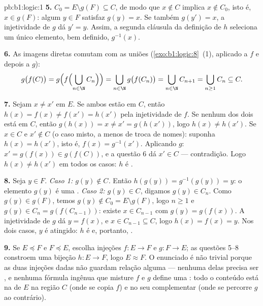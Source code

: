 \begin{solution}{pb:b1:logic:1}
\textbf{5.} $C_0 = E \setminus g(F) \subseteq C$, de modo que $x \notin C$
implica $x \notin C_0$, isto é, $x \in g(F)$: algum $y \in F$ satisfaz
$g(y) = x$. Se também $g(y') = x$, a injetividade de $g$ dá $y' = y$.
Assim, a segunda cláusula da definição de $h$ seleciona um único
elemento, bem definido, $g^{-1}(x)$.

\textbf{6.} As imagens diretas comutam com as uniões
(\cref{exo:b1:logic:8}~(1), aplicado a $f$ e depois a $g$):
\[
g\bigl(f(C)\bigr)
= g\Bigl(f\Bigl(\bigcup_{n \in \N} C_n\Bigr)\Bigr)
= \bigcup_{n \in \N} g\bigl(f(C_n)\bigr)
= \bigcup_{n \in \N} C_{n+1}
= \bigcup_{n \geq 1} C_n \subseteq C .
\]

\textbf{7.} Sejam $x \neq x'$ em $E$. Se ambos estão em $C$, então $h(x) =
f(x) \neq f(x') = h(x')$ pela injetividade de $f$. Se nenhum dos dois está em
$C$, então $g(h(x)) = x \neq x' = g(h(x'))$, logo $h(x) \neq h(x')$. Se
$x \in C$ e $x' \notin C$ (o caso misto, a menos de troca de nomes):
suponha $h(x) = h(x')$, isto é, $f(x) = g^{-1}(x')$. Aplicando $g$:
$x' = g(f(x)) \in g(f(C))$, e a questão 6 dá $x' \in C$ ---
contradição. Logo $h(x) \neq h(x')$ em todos os casos: $h$ é .

\textbf{8.} Seja $y \in F$. \emph{Caso 1: $g(y) \notin C$.} Então
$h(g(y)) = g^{-1}(g(y)) = y$: o elemento $g(y)$ é uma .
\emph{Caso 2: $g(y) \in C$}, digamos $g(y) \in C_n$. Como $g(y) \in
g(F)$, temos $g(y) \notin C_0 = E \setminus g(F)$, logo $n \geq 1$
e $g(y) \in C_n = g(f(C_{n-1}))$: existe $x \in C_{n-1}$ com
$g(y) = g(f(x))$. A injetividade de $g$ dá $y = f(x)$, e $x \in
C_{n-1} \subseteq C$, logo $h(x) = f(x) = y$. Nos dois casos, $y$ é
atingido: $h$ é  e, portanto, .

\textbf{9.} Se $E \preceq F$ e $F \preceq E$, escolha injeções $f
\colon E \to F$ e $g \colon F \to E$; as questões 5--8 constroem uma
bijeção $h \colon E \to F$, logo $E \approx F$. O enunciado é
não trivial porque as duas injeções dadas não guardam relação alguma ---
nenhuma delas precisa ser , e nenhuma fórmula ingênua que
misture $f$ e $g$ define uma : todo o conteúdo está na 
de $E$ na região $C$ (onde se copia $f$) e no seu complementar (onde se
percorre $g$ ao contrário).


\end{solution}

